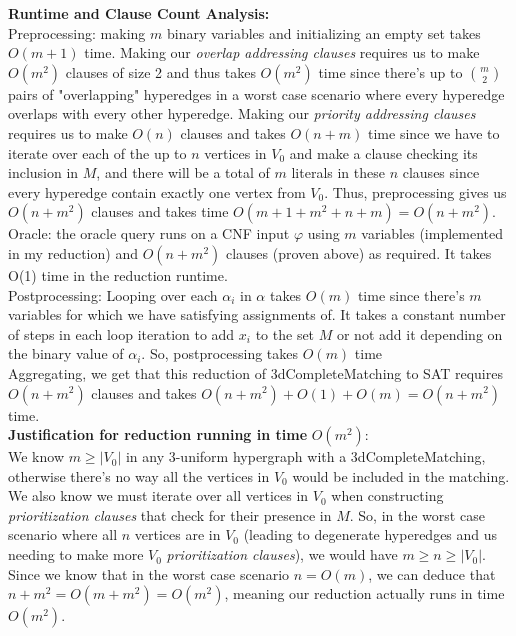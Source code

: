\documentclass[11pt]{article}
\begin{document}
\begin{enumerate}
\begin{enumerate}
\textbf{Runtime and Clause Count Analysis:} \\

Preprocessing: making $m$ binary variables and initializing an empty set takes $O(m + 1)$ time. Making our \textit{overlap addressing clauses} requires us to make $O(m^2)$ clauses of size 2 and thus takes $O(m^2)$ time since there's up to $\binom{m}{2}$ pairs of "overlapping" hyperedges in a worst case scenario where every hyperedge overlaps with every other hyperedge. Making our \textit{priority addressing clauses} requires us to make $O(n)$ clauses and takes $O(n+m)$ time since we have to iterate over each of the up to $n$ vertices in $V_0$ and make a clause checking its inclusion in $M$, and there will be a total of $m$ literals in these $n$ clauses since every hyperedge contain exactly one vertex from $V_0$. Thus, preprocessing gives us $O(n + m^2)$ clauses and takes time $O(m+1+m^2+n+m)=O(n+m^2)$. \\

Oracle: the oracle query runs on a CNF input $\varphi$ using $m$ variables (implemented in my reduction) and $O(n + m^2)$ clauses (proven above) as required. It takes O(1) time in the reduction runtime. \\

Postprocessing: Looping over each $\alpha_i$ in $\alpha$ takes $O(m)$ time since there's $m$ variables for which we have satisfying assignments of. It takes a constant number of steps in each loop iteration to add $x_i$ to the set $M$ or not add it depending on the binary value of $\alpha_i$. So, postprocessing takes $O(m)$ time \\

Aggregating, we get that this reduction of 3dCompleteMatching to SAT requires $O(n + m^2)$ clauses and takes $O(n + m^2) + O(1) + O(m) = O(n + m^2)$ time. \\

\textbf{Justification for reduction running in time} $O(m^2)$: \\

We know $m \geq |V_0|$ in any 3-uniform hypergraph with a 3dCompleteMatching, otherwise there's no way all the vertices in $V_0$ would be included in the matching. We also know we must iterate over all vertices in $V_0$ when constructing \textit{prioritization clauses} that check for their presence in $M$. So, in the worst case scenario where all $n$ vertices are in $V_0$ (leading to degenerate hyperedges and us needing to make more $V_0$ \textit{prioritization clauses}), we would have $m \geq n \geq |V_0|$. Since we know that in the worst case scenario $n = O(m)$, we can deduce that $n + m^2 = O(m + m^2) = O(m^2)$, meaning our reduction actually runs in time $O(m^2)$. \\


\end{enumerate}
\end{enumerate}
\end{document}
